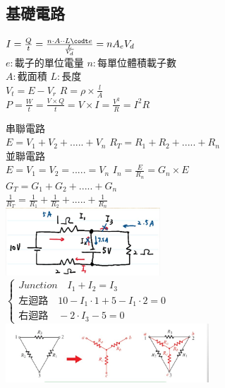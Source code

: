 \documentclass[a4paper,10pt,twocolumn,oneside]{article}
\begin{document}
\begin{normalsize}
\subsection{基礎電路}
$I=\frac{Q}{t}=\frac{n \cdot A \cdot \cdot L \codt e}{\frac{L}{V_{d}}}=nA_{e}V_{d}$\\
$ e:載子的單位電量$ $n:每單位體積載子數$\\$A:截面積$ $L:長度$\\
$ V_{t}=E-V_{r} $ \quad $ R=\rho \times \frac{l}{A}$\\ 
$ P=\frac{W}{t}=\frac{V \times Q}{t}=V\times I=\frac{V^2}{R}=I^2 R$ 

串聯電路 \\
$ E=V_{1}+V_{2}+.....+V_{n}$ \quad
$ R_{T}=R_{1}+R_{2}+.....+R_{n}$ \\ 
並聯電路 \\
$ E=V_{1}=V_{2}=.....=V_{n}$ \quad
$ I_{n}=\frac{E}{R_{n}}=G_{n}\times E$ \\ 
$ G_{T}=G_{1}+G_{2}+.....+G_{n}$ \\
$ \frac{1}{R_{T}}=\frac{1}{R_{1}}+\frac{1}{R_{2}}+.....+\frac{1}{R_{n}}$ \\ 
\includegraphics[height=1in]{kirchhoff.jpg}\\
$
\left\{
\begin{array}{l}
Junction \quad  I_{1}+I_{2}=I_{3}\\
左迴路 \quad  10-I_{1}\cdot 1+5-I_{1} \cdot 2 =0\\
右迴路 \quad -2 \cdot I_{3}-5=0
\end{array}
\right .
$ \\
\includegraphics[width=3in]{TriangleCircuit.jpg} \\

\end{normalsize}
\end{document}
